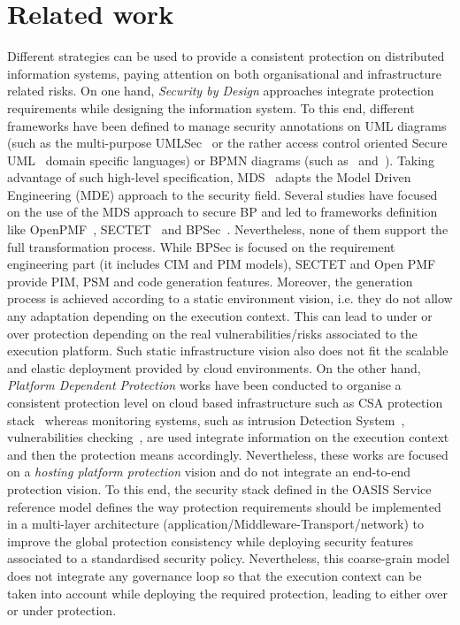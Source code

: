 \documentclass[runningheads,a4paper]{llncs}
\begin{document}
\section{Related work}
\label{relatedwork}
Different strategies can be used to provide a consistent protection on distributed information systems, paying attention on both organisational and infrastructure related risks. On one hand, \textit{Security by Design} approaches integrate protection requirements while designing the information system. To this end, different frameworks have been defined to manage security annotations on UML diagrams (such as the multi-purpose UMLSec~\cite{JJ02} or the rather access control oriented  Secure UML~\cite{LBD02} domain specific languages) or BPMN diagrams (such as~\cite{WMS09} and~\cite{SSL09}). Taking advantage of such high-level specification, MDS~\cite{LS09}\cite{LZN14} adapts the Model Driven Engineering (MDE) approach to the security field. Several studies have focused on the use of the MDS approach to secure BP and led to frameworks definition like OpenPMF~\cite{LU10}, SECTET~\cite{AHB08} and BPSec~\cite{RFP07}. Nevertheless, none of them support the full transformation process. While BPSec is focused on the requirement engineering part (it includes CIM and PIM models), SECTET and Open PMF provide PIM, PSM and code generation features. Moreover, the generation process is achieved according to a static environment vision, i.e. they do not allow any adaptation depending on the execution context. This can lead to under or over protection depending on the real vulnerabilities/risks associated to the execution platform. Such static infrastructure vision also does not fit the scalable and elastic deployment provided by cloud environments.
On the other hand, \textit{Platform Dependent Protection} works have been conducted to organise a consistent protection level on cloud based infrastructure such as CSA protection stack~\cite{CSA11} whereas monitoring systems, such as intrusion Detection System~\cite{MPB12}, vulnerabilities checking~\cite{AVG11}, are used integrate information on the execution context and then the protection means accordingly. Nevertheless, these works are focused on a \textit{hosting platform protection} vision and do not integrate an end-to-end protection vision. To this end, the security stack defined in the OASIS Service reference model defines the way protection requirements should be implemented in a multi-layer architecture (application/Middleware-Transport/network) to improve the global protection consistency while deploying security features associated to a standardised security policy. Nevertheless, this coarse-grain model does not integrate any governance loop so that the execution context can be taken into account while deploying the required protection, leading to either over or under protection.
\end{document}
